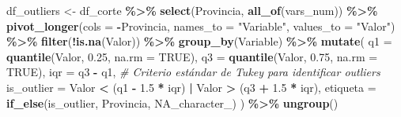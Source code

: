 \documentclass[
]{article}
\newenvironment{Shaded}{\begin{snugshade}}{\end{snugshade}}
\newcommand{\AttributeTok}[1]{\textcolor[rgb]{0.13,0.29,0.53}{#1}}
\newcommand{\CommentTok}[1]{\textcolor[rgb]{0.56,0.35,0.01}{\textit{#1}}}
\newcommand{\ConstantTok}[1]{\textcolor[rgb]{0.56,0.35,0.01}{#1}}
\newcommand{\FloatTok}[1]{\textcolor[rgb]{0.00,0.00,0.81}{#1}}
\newcommand{\FunctionTok}[1]{\textcolor[rgb]{0.13,0.29,0.53}{\textbf{#1}}}
\newcommand{\NormalTok}[1]{#1}
\newcommand{\OtherTok}[1]{\textcolor[rgb]{0.56,0.35,0.01}{#1}}
\newcommand{\SpecialCharTok}[1]{\textcolor[rgb]{0.81,0.36,0.00}{\textbf{#1}}}
\newcommand{\StringTok}[1]{\textcolor[rgb]{0.31,0.60,0.02}{#1}}
\begin{document}
\begin{Shaded}
\begin{Highlighting}[]
\NormalTok{df\_outliers }\OtherTok{\textless{}{-}}\NormalTok{ df\_corte }\SpecialCharTok{\%\textgreater{}\%}
  \FunctionTok{select}\NormalTok{(Provincia, }\FunctionTok{all\_of}\NormalTok{(vars\_num)) }\SpecialCharTok{\%\textgreater{}\%}
  \FunctionTok{pivot\_longer}\NormalTok{(}\AttributeTok{cols =} \SpecialCharTok{{-}}\NormalTok{Provincia, }\AttributeTok{names\_to =} \StringTok{"Variable"}\NormalTok{, }\AttributeTok{values\_to =} \StringTok{"Valor"}\NormalTok{) }\SpecialCharTok{\%\textgreater{}\%}
  \FunctionTok{filter}\NormalTok{(}\SpecialCharTok{!}\FunctionTok{is.na}\NormalTok{(Valor)) }\SpecialCharTok{\%\textgreater{}\%}
  \FunctionTok{group\_by}\NormalTok{(Variable) }\SpecialCharTok{\%\textgreater{}\%}
  \FunctionTok{mutate}\NormalTok{(}
    \AttributeTok{q1 =} \FunctionTok{quantile}\NormalTok{(Valor, }\FloatTok{0.25}\NormalTok{, }\AttributeTok{na.rm =} \ConstantTok{TRUE}\NormalTok{),}
    \AttributeTok{q3 =} \FunctionTok{quantile}\NormalTok{(Valor, }\FloatTok{0.75}\NormalTok{, }\AttributeTok{na.rm =} \ConstantTok{TRUE}\NormalTok{),}
    \AttributeTok{iqr =}\NormalTok{ q3 }\SpecialCharTok{{-}}\NormalTok{ q1,}
    \CommentTok{\# Criterio estándar de Tukey para identificar outliers}
    \AttributeTok{is\_outlier =}\NormalTok{ Valor }\SpecialCharTok{\textless{}}\NormalTok{ (q1 }\SpecialCharTok{{-}} \FloatTok{1.5} \SpecialCharTok{*}\NormalTok{ iqr) }\SpecialCharTok{|}\NormalTok{ Valor }\SpecialCharTok{\textgreater{}}\NormalTok{ (q3 }\SpecialCharTok{+} \FloatTok{1.5} \SpecialCharTok{*}\NormalTok{ iqr),}
    \AttributeTok{etiqueta =} \FunctionTok{if\_else}\NormalTok{(is\_outlier, Provincia, }\ConstantTok{NA\_character\_}\NormalTok{)}
\NormalTok{  ) }\SpecialCharTok{\%\textgreater{}\%}
  \FunctionTok{ungroup}\NormalTok{()}


\end{Highlighting}
\end{Shaded}
\end{document}
